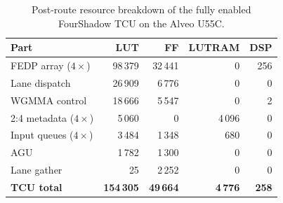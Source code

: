 \begin{table}
  \centering
  \caption{Post-route resource breakdown of the fully enabled
  FourShadow TCU on the Alveo U55C.}
  \label{tab:tcu-parts}
  \setlength{\tabcolsep}{5pt}
  \renewcommand{\arraystretch}{1.15}
  \begin{tabular}{@{}lrrrr@{}}
  \toprule
  \textbf{Part} & \textbf{LUT} & \textbf{FF} &
  \textbf{LUTRAM} & \textbf{DSP} \\
  \midrule
  FEDP array ($4\times$)                        & 98\,379 & 32\,441 & 0 & 256 \\
  Lane dispatch                                 & 26\,909 & 6\,776  & 0 & 0   \\
  WGMMA control                                 & 18\,666 & 5\,547  & 0 & 2   \\
  2:4 metadata ($4\times$)                      & 5\,060  & 0       & 4\,096 & 0   \\
  Input queues ($4\times$)                      & 3\,484  & 1\,348  & 680 & 0   \\
  AGU                                           & 1\,782  & 1\,300  & 0 & 0   \\
  Lane gather                                   & 25      & 2\,252  & 0 & 0   \\
  \midrule
  \textbf{TCU total}                            &
  \textbf{154\,305} & \textbf{49\,664} & \textbf{4\,776} & \textbf{258} \\
  \bottomrule
  \end{tabular}
\end{table}

